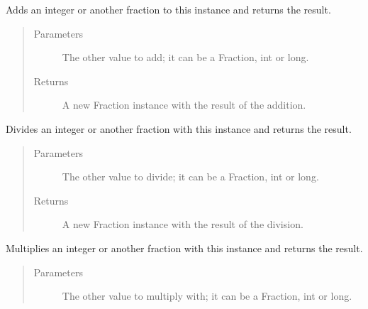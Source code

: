 \documentclass[letterpaper,10pt,english]{sphinxmanual}
\begin{document}
\begin{fulllineitems}
\begin{fulllineitems}
\begin{quote}
\begin{description}
\end{description}\end{quote}

\end{fulllineitems}


\begin{fulllineitems}
\label{\detokenize{fraction:fraction.Fraction.__radd__}}
Adds an integer or another fraction to this instance and returns the result.
\begin{quote}\begin{description}
\item[{Parameters}] \leavevmode
{} \textendash{} The other value to add; it can be a Fraction, int or long.

\item[{Returns}] \leavevmode
A new Fraction instance with the result of the addition.

\end{description}\end{quote}

\end{fulllineitems}


\begin{fulllineitems}
\label{\detokenize{fraction:fraction.Fraction.__rdiv__}}
Divides an integer or another fraction with this instance and returns the result.
\begin{quote}\begin{description}
\item[{Parameters}] \leavevmode
{} \textendash{} The other value to divide; it can be a Fraction, int or long.

\item[{Returns}] \leavevmode
A new Fraction instance with the result of the division.

\end{description}\end{quote}

\end{fulllineitems}


\begin{fulllineitems}
\label{\detokenize{fraction:fraction.Fraction.__rmul__}}
Multiplies an integer or another fraction with this instance and returns the result.
\begin{quote}\begin{description}
\item[{Parameters}] \leavevmode
{} \textendash{} The other value to multiply with; it can be a Fraction, int or long.


\end{description}
\end{quote}
\end{fulllineitems}
\end{fulllineitems}
\end{document}

